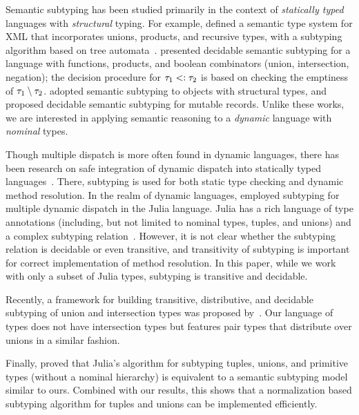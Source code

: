 Semantic subtyping has been studied primarily in the context of
\emph{statically typed} languages with \emph{structural} typing. 
For example, \citet{bib:Hosoya:2003:XDuce} defined 
a semantic type system for XML that incorporates unions, products,
and recursive types, with a subtyping algorithm based on tree 
automata~\cite{bib:Hosoya:2005:XML}.
\citet{bib:Frisch:2008:sem-sub} presented decidable semantic subtyping
for a language with functions, products, and boolean combinators 
(union, intersection, negation); the decision procedure 
for $\tau_1 <: \tau_2$ is based on checking
the emptiness of $\tau_1 \setminus \tau_2$. 
\citet{bib:Dardha:2013:semsub-oo} adopted semantic subtyping
to objects with structural types, and \citet{bib:Ancona:2016:sem-sub-oo} 
proposed decidable semantic subtyping for mutable records.
Unlike these works, we are interested in applying semantic reasoning
to a \emph{dynamic} language with \emph{nominal} types.

Though {multiple dispatch} is more often found in dynamic languages,
there has been research on safe integration of dynamic dispatch into
statically typed languages~\cite{bib:Chambers:1992:Cecil, 
Castagna:1992:COF:141471.141537, bib:Clifton:2000:MultiJava,
Allen:2011:TCM:2076021.2048140,Park:2019:PSM:3302515.3290324}. 
There, subtyping is used for both
static type checking and dynamic method resolution.
In the realm of dynamic languages, \citet{Bezanson2015AbstractionIT} 
employed subtyping for multiple dynamic dispatch in the Julia language.
Julia has a rich language of type annotations 
(including, but not limited to nominal types, tuples, and unions) 
and a complex subtyping relation~\cite{ZappaNardelli:2018:JSR:3288538.3276483}. 
However, it is not clear whether the subtyping relation is decidable 
or even transitive, and transitivity of subtyping is important
for correct implementation of method resolution.
In this paper, while we work with only a subset of Julia types, 
subtyping is transitive and decidable.

Recently, a framework for building transitive, distributive,
and decidable subtyping of union and intersection types was proposed 
by~\citet{Muehlboeck:2018:EUI:3288538.3276482}.
Our language of types does not have intersection types but features
pair types that distribute over unions in a similar fashion.

Finally, \citet{bib:Chung19} proved that Julia's algorithm for subtyping
tuples, unions, and primitive types (without a nominal hierarchy)
is equivalent to a semantic subtyping model similar to ours.
Combined with our results, this shows that a normalization based
subtyping algorithm for tuples and unions can be implemented efficiently.
